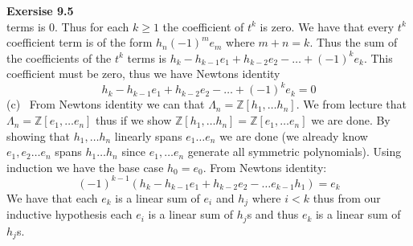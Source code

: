 \documentclass[12pt]{article}
\newenvironment{ques}[1]{\textbf{Exersise #1}\vspace{1 mm}\\ }{\bigskip}
\theoremstyle{definition}
\newcommand{\Z}{\mathbb Z}
\begin{document}
\begin{ques}{9.5}
	terms is $0$. Thus for each $k \geq 1$ the coefficient of $t^k$ is zero. We
	have that every $t^k$ coefficient term is of the form
	$h_n(-1)^me_m$ where $m + n = k$.  Thus the sum of the coefficients of the
	$t^k$ terms is $h_k - h_{k-1}e_1 + h_{k-2}e_2 - \dots + (-1)^ke_k$. This
	coefficient must be zero, thus we have Newtons identity
	$$h_k - h_{k-1}e_1 + h_{k-2}e_2 - \dots + (-1)^ke_k = 0$$
	(c) \ From Newtons identity we can that $\Lambda_n =
	\Z[h_1, \dots h_n]$. We from lecture that $\Lambda_n = \Z[e_1, \dots
	e_n]$ thus if we show $\Z[h_1, \dots h_n] = \Z[e_1 , \dots e_n]$ we are done.
	By showing that $h_1, \dots h_n$ linearly spans $e_1 \dots e_n$ we are done
	(we already know $e_1, e_2 \dots e_n$ spans $h_1 \dots h_n$ since $e_1,
	\dots e_n$ generate all symmetric polynomials). Using induction we have the
	base case $h_0 = e_0$. From Newtons identity:
	$$(-1)^{k-1}(h_k - h_{k-1}e_1 + h_{k-2}e_2 - \dots e_{k-1}h_1) = e_k$$
	We have that each $e_k$ is a linear sum of $e_i$ and $h_j$ where $i < k$
	thus from our inductive hypothesis each $e_i$ is a linear sum of
	$h_j$s and thus $e_k$ is a linear sum of $h_j$s. 
\end{ques}
\end{document}
